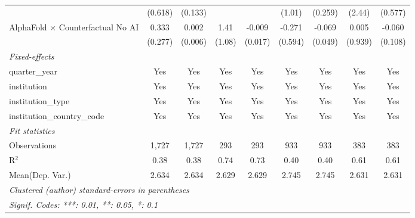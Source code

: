 \begin{tabular}{lcccccccc}
                                            & (0.618) & (0.133) &         &         & (1.01)  & (0.259) & (2.44)  & (0.577)\\   
   AlphaFold $\times$ Counterfactual No AI  & 0.333   & 0.002   & 1.41    & -0.009  & -0.271  & -0.069  & 0.005   & -0.060\\   
                                            & (0.277) & (0.006) & (1.08)  & (0.017) & (0.594) & (0.049) & (0.939) & (0.108)\\   
   \midrule
   \emph{Fixed-effects}\\
   quarter\_year                            & Yes     & Yes     & Yes     & Yes     & Yes     & Yes     & Yes     & Yes\\  
   institution                              & Yes     & Yes     & Yes     & Yes     & Yes     & Yes     & Yes     & Yes\\  
   institution\_type                        & Yes     & Yes     & Yes     & Yes     & Yes     & Yes     & Yes     & Yes\\  
   institution\_country\_code               & Yes     & Yes     & Yes     & Yes     & Yes     & Yes     & Yes     & Yes\\  
   \midrule
   \emph{Fit statistics}\\
   Observations                             & 1,727   & 1,727   & 293     & 293     & 933     & 933     & 383     & 383\\  
   R$^2$                                    & 0.38    & 0.38    & 0.74    & 0.73    & 0.40    & 0.40    & 0.61    & 0.61\\  
Mean(Dep. Var.) & 2.634 & 2.634 & 2.629 & 2.629 & 2.745 & 2.745 & 2.631 & 2.631 \\
   \midrule \midrule
   \multicolumn{9}{l}{\emph{Clustered (author) standard-errors in parentheses}}\\
   \multicolumn{9}{l}{\emph{Signif. Codes: ***: 0.01, **: 0.05, *: 0.1}}\\
\end{tabular}
\par\endgroup
